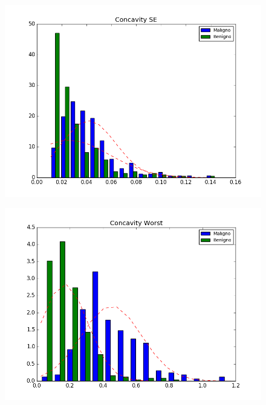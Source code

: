 \documentclass[11pt,a4paper]{article}
\numberwithin{equation}{section}
\begin{document}
\begin{itemize}
\begin{figure}[H]
\centering
\begin{minipage}{.5\textwidth}
  \centering
  \includegraphics[width=\linewidth]{../img/hist/concavity_se}
  \label{fig:test1}
\end{minipage}%
\begin{minipage}{.5\textwidth}
  \centering
  \includegraphics[width=\linewidth]{../img/hist/concavity_worst}
  \label{fig:test2}
\end{minipage}
\end{figure}


\end{itemize}
\end{document}
